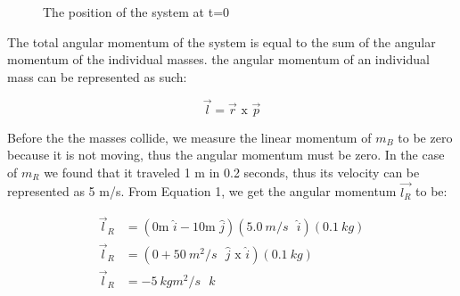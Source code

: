 \documentclass[12pt]{article}
\begin{document}
\begin{figure}[H]
    \centering

    \caption[10pt]{The position of the system at t=0}

\end{figure}
The total angular momentum of the system is equal to the sum of the angular momentum of the individual masses. the angular momentum of an individual mass can be represented as such:

\begin{equation} \label{eq1}
    \vec{l} = \vec{r} \text{ x } \vec{p}
\end{equation}


Before the the masses collide, we measure the linear momentum of $m_B$ to be zero because it is not moving, thus the angular momentum must be zero. In the case of $m_R$ we found that it traveled 1 m in 0.2 seconds, thus its velocity can be represented as 5 m/s. From Equation 1, we get the angular momentum $\vec{l_R}$ to be:

\begin{equation*}
    \begin{split}
        \vec{l}_R & = (0 \text{m $\hat{i}$} - 10 \text{m $\hat{j}$})(\SI{5.0}{m/s} \text{ $\hat{i}$}) (\SI{0.1}{kg}) \\
        \vec{l}_R & = (0 + \SI{50}{m^2/s} \text{ $\hat{j}$ x $\hat{i}$}) (\SI{0.1}{kg}) \\
        \vec{l}_R & = \SI{-5}{kg m^2/s} \text{ $\hat{k}$}
    \end{split}
\end{equation*}
\end{document}
